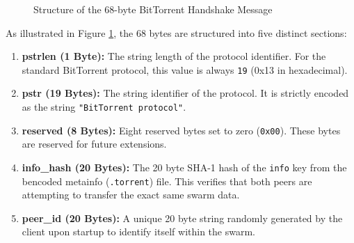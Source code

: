 \documentclass[a4paper,12pt]{article}
\begin{document}
\begin{figure}[H]
    \centering
    \caption{Structure of the 68-byte BitTorrent Handshake Message}
    \label{fig:handshake}
\end{figure}

As illustrated in Figure \ref{fig:handshake}, the 68 bytes are structured into five distinct sections:

\begin{enumerate}
    \item \textbf{pstrlen (1 Byte):} The string length of the protocol identifier. For the standard BitTorrent protocol, this value is always \texttt{19} (0x13 in hexadecimal).
    
    \item \textbf{pstr (19 Bytes):} The string identifier of the protocol. It is strictly encoded as the string \texttt{"BitTorrent protocol"}.
    
    \item \textbf{reserved (8 Bytes):} Eight reserved bytes set to zero (\texttt{0x00}). These bytes are reserved for future extensions.
    
    \item \textbf{info\_hash (20 Bytes):} The 20 byte SHA-1 hash of the \texttt{info} key from the bencoded metainfo (\texttt{.torrent}) file. This verifies that both peers are attempting to transfer the exact same swarm data.
    
    \item \textbf{peer\_id (20 Bytes):} A unique 20 byte string randomly generated by the client upon startup to identify itself within the swarm.
\end{enumerate}
\end{document}
